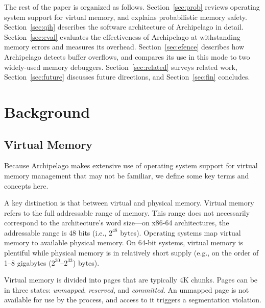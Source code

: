 \documentclass{acm_proc_article-sp}
\begin{document}


The rest of the paper is organized as follows. Section~\ref{sec:prob}
reviews operating system support for virtual memory, and explains
probabilistic memory safety. Section~\ref{sec:qih} describes the
software architecture of Archipelago in detail. Section~\ref{sec:eval}
evaluates the effectiveness of Archipelago at withstanding memory
errors and measures its overhead. Section~\ref{sec:efence}
describes how Archipelago detects buffer overflows, and compares its
use in this mode to two widely-used memory
debuggers. Section~\ref{sec:related} surveys related work,
Section~\ref{sec:future} discusses future directions, and
Section~\ref{sec:fin} concludes.

\section{Background}

\subsection{Virtual Memory}
\label{sec:virtual_memory}

\noindent
Because Archipelago makes extensive use of operating system support
for virtual memory management that may not be familiar, we define some
key terms and concepts here.

A key distinction is that between virtual and physical memory. Virtual
memory refers to the full addressable range of memory. This range does
not necessarily correspond to the architecture's word size---on x86-64
architectures, the addressable range is 48 bits (i.e., $2^{48}$
bytes). Operating systems map virtual memory to available physical
memory. On 64-bit systems, virtual memory is plentiful while physical
memory is in relatively short supply (e.g., on the order of 1--8
gigabytes ($2^{30}$--$2^{33}$) bytes).

Virtual memory is divided into pages that are typically 4K
chunks. Pages can be in three states: \emph{unmapped},
\emph{reserved}, and \emph{committed}. An unmapped page is not
available for use by the process, and access to it triggers a
segmentation violation.
\end{document}
